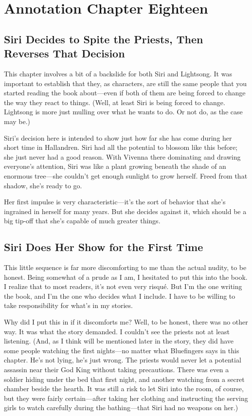 \section{Annotation Chapter Eighteen}

\subsection*{Siri Decides to Spite the Priests, Then Reverses That Decision}

This chapter involves a bit of a backslide for both Siri and Lightsong. It was important to establish that they, as characters, are still the same people that you started reading the book about—even if both of them are being forced to change the way they react to things. (Well, at least Siri is being forced to change. Lightsong is more just mulling over what he wants to do. Or not do, as the case may be.)

Siri’s decision here is intended to show just how far she has come during her short time in Hallandren. Siri had all the potential to blossom like this before; she just never had a good reason. With Vivenna there dominating and drawing everyone’s attention, Siri was like a plant growing beneath the shade of an enormous tree—she couldn’t get enough sunlight to grow herself. Freed from that shadow, she’s ready to go.

Her first impulse is very characteristic—it’s the sort of behavior that she’s ingrained in herself for many years. But she decides against it, which should be a big tip-off that she’s capable of much greater things.

\subsection*{Siri Does Her Show for the First Time}

This little sequence is far more discomforting to me than the actual nudity, to be honest. Being somewhat of a prude as I am, I hesitated to put this into the book. I realize that to most readers, it’s not even very risqué. But I’m the one writing the book, and I’m the one who decides what I include. I have to be willing to take responsibility for what’s in my stories.

Why did I put this in if it discomforts me? Well, to be honest, there was no other way. It was what the story demanded. I couldn’t see the priests not at least listening. (And, as I think will be mentioned later in the story, they did have some people watching the first nights—no matter what Bluefingers says in this chapter. He’s not lying, he’s just wrong. The priests would never let a potential assassin near their God King without taking precautions. There was even a soldier hiding under the bed that first night, and another watching from a secret chamber beside the hearth. It was still a risk to let Siri into the room, of course, but they were fairly certain—after taking her clothing and instructing the serving girls to watch carefully during the bathing—that Siri had no weapons on her.)

